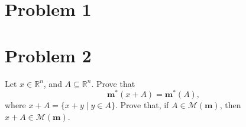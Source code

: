 \documentclass[11pt]{article}
\begin{document}
	
	
	\psetheader

\section*{Problem 1}


\newpage

\section*{Problem 2}
\begin{problem}
    Let $x \in \mathbb{R}^n$, and $A \subseteq \mathbb{R}^n$. Prove that
\[
\mathbf{m}^*(x + A) = \mathbf{m}^*(A),
\]
where $x + A = \{x + y \mid y \in A\}$. Prove that, if $A \in \mathcal{M}(\mathbf{m})$, then $x + A \in \mathcal{M}(\mathbf{m})$.
\end{problem}
\end{document}
